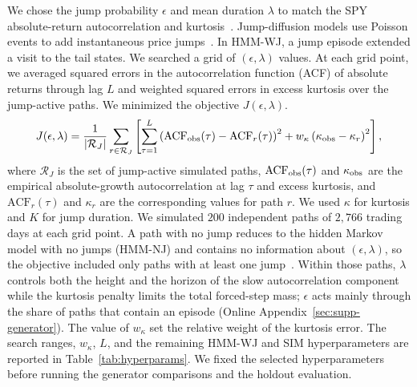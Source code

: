 We chose the jump probability $\epsilon$ and mean duration $\lambda$
to match the SPY absolute-return autocorrelation and
kurtosis~\cite{mandelbrot1963, cont2001,
rydenTerasvirtaAsbrink1998}. Jump-diffusion models use Poisson events to
add instantaneous price jumps~\cite{merton1976, kou2002}. In HMM-WJ, a
jump episode extended a visit to the tail states. We searched a grid of
$(\epsilon,\lambda)$ values. At each grid point, we averaged squared
errors in the autocorrelation function (ACF) of absolute returns through lag $L$ and
weighted squared errors in excess kurtosis over the jump-active paths.
We minimized the objective $J(\epsilon,\lambda)$.
\begin{equation}
    J(\epsilon, \lambda) =
    \frac{1}{|\mathcal{R}_J|}\sum_{r\in\mathcal{R}_J}
    \left[
    \sum_{\tau=1}^{L} \left( \mathrm{ACF}_{\rm obs}(\tau)
    - \mathrm{ACF}_{r}(\tau) \right)^2
    + w_\kappa \left( \kappa_{\rm obs} - \kappa_{r} \right)^2
    \right],
    \label{eq:grid_search}
\end{equation}
where $\mathcal{R}_J$ is the set of jump-active simulated paths,
$\mathrm{ACF}_{\rm obs}(\tau)$ and $\kappa_{\rm obs}$ are the empirical
absolute-growth autocorrelation at lag $\tau$ and excess kurtosis, and
$\mathrm{ACF}_{r}(\tau)$ and $\kappa_r$ are the corresponding values
for path $r$. We used $\kappa$ for kurtosis and $K$ for jump duration.
We simulated $200$ independent paths of $2{,}766$ trading days at
each grid point. A path with no jump reduces to the hidden Markov model
with no jumps (HMM-NJ) and contains no
information about $(\epsilon,\lambda)$, so the objective included only
paths with at least one jump~\cite{glasserman2003}. Within those
paths, $\lambda$ controls both the height and the horizon of the slow
autocorrelation component while the kurtosis penalty limits the total
forced-step mass; $\epsilon$ acts mainly through the share of paths
that contain an episode
(Online Appendix~\ref{sec:supp-generator}). The value of
$w_\kappa$ set the relative weight of the kurtosis error. The search ranges,
$w_\kappa$, $L$, and the remaining HMM-WJ and SIM hyperparameters are
reported in Table~\ref{tab:hyperparams}. We fixed the selected
hyperparameters before running the generator comparisons and the
holdout evaluation.
